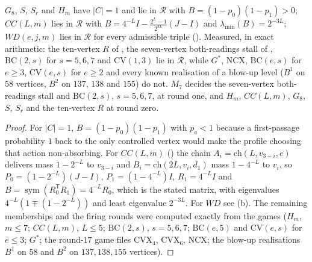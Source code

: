 \begin{proposition}\label{hz:stalls}
$G_8$, $S$, $S_r$ and $H_m$ have $|C|=1$ and lie in $\mathcal R$ with
$B=(1-p_0)(1-p_1)>0$; $CC(L,m)$ lies in $\mathcal R$ with
$B=4^{-L}I-\tfrac{2^{L}-1}{2^{3L}}(J-I)$ and
$\lambda_{\min}(B)=2^{-3L}$; $WD(e,j,m)$ lies in $\mathcal R$ for every
admissible triple (). Measured, in exact arithmetic: the
ten-vertex $R$ of , the seven-vertex both-readings stall
of , $\mathrm{BC}(2,s)$ for $s=5,6,7$ and
$\mathrm{CV}(1,3)$ lie in $\mathcal R$, while $G^{\ast}$, $\mathrm{NCX}$,
$\mathrm{BC}(e,s)$ for $e\ge3$, $\mathrm{CV}(e,s)$ for $e\ge2$ and every known
realisation of a blow-up level ($B^{1}$ on $58$ vertices, $B^{2}$ on $137$,
$138$ and $155$) do not. $M_7$ decides the seven-vertex both-readings stall and
$\mathrm{BC}(2,s)$, $s=5,6,7$, at round one, and $H_m$, $CC(L,m)$, $G_8$, $S$,
$S_r$ and the ten-vertex $R$ at round zero.
\end{proposition}

\begin{proof}
For $|C|=1$, $B=(1-p_0)(1-p_1)$ with $p_a<1$ because a first-passage
probability $1$ back to the only controlled vertex would make the profile
choosing that action non-absorbing. For $CC(L,m)$ ()
the chain $A_i=\mathrm{ch}(L,v_{3-i},e)$ delivers mass $1-2^{-L}$ to
$v_{3-i}$ and $B_i=\mathrm{ch}(2L,v_i,d_1)$ mass $1-4^{-L}$ to $v_i$, so
$P_0=(1-2^{-L})(J-I)$, $P_1=(1-4^{-L})I$, $R_1=4^{-L}I$ and
$B=\operatorname{sym}(R_0^{\mathsf T}R_1)=4^{-L}R_0$, which is the stated
matrix, with eigenvalues $4^{-L}(1\mp(1-2^{-L}))$ and least eigenvalue
$2^{-3L}$. For $WD$ see (b). The remaining memberships and
the firing rounds were computed exactly from the games ($H_m$, $m\le7$;
$CC(L,m)$, $L\le5$; $\mathrm{BC}(2,s)$, $s=5,6,7$; $\mathrm{BC}(e,5)$ and
$\mathrm{CV}(e,s)$ for $e\le3$; $G^{\ast}$; the round-$17$ game files
$\mathrm{CVX}_4$, $\mathrm{CVX}_6$, $\mathrm{NCX}$; the blow-up realisations
$B^{1}$ on $58$ and $B^{2}$ on $137,138,155$ vertices).
\end{proof}

